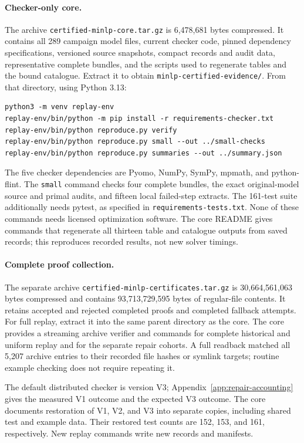 \paragraph{Checker-only core.}
The archive \texttt{certified-minlp-core.tar.gz} is 6,478,681 bytes compressed. It contains all 289 campaign model files, current checker code, pinned dependency specifications, versioned source snapshots, compact records and audit data, representative complete bundles, and the scripts used to regenerate tables and the bound catalogue. Extract it to obtain \texttt{minlp-certified-evidence/}. From that directory, using Python 3.13:
\begin{verbatim}
python3 -m venv replay-env
replay-env/bin/python -m pip install -r requirements-checker.txt
replay-env/bin/python reproduce.py verify
replay-env/bin/python reproduce.py small --out ../small-checks
replay-env/bin/python reproduce.py summaries --out ../summary.json
\end{verbatim}
The five checker dependencies are Pyomo, NumPy, SymPy, mpmath, and python-flint. The \texttt{small} command checks four complete bundles, the exact original-model source and primal audits, and fifteen local failed-step extracts. The 161-test suite additionally needs pytest, as specified in \texttt{requirements-tests.txt}. None of these commands needs licensed optimization software. The core README gives commands that regenerate all thirteen table and catalogue outputs from saved records; this reproduces recorded results, not new solver timings.

\paragraph{Complete proof collection.}
The separate archive \texttt{certified-minlp-certificates.tar.gz} is 30,664,561,063 bytes compressed and contains 93,713,729,595 bytes of regular-file contents. It retains accepted and rejected completed proofs and completed fallback attempts. For full replay, extract it into the same parent directory as the core. The core provides a streaming archive verifier and commands for complete historical and uniform replay and for the separate repair cohorts. A full readback matched all 5,207 archive entries to their recorded file hashes or symlink targets; routine example checking does not require repeating it.

The default distributed checker is version V3; Appendix~\ref{app:repair-accounting} gives the measured V1 outcome and the expected V3 outcome. The core documents restoration of V1, V2, and V3 into separate copies, including shared test and example data. Their restored test counts are 152, 153, and 161, respectively. New replay commands write new records and manifests.

